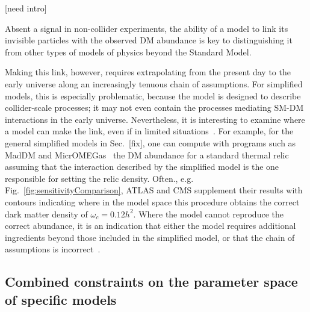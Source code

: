 
[need intro]

Absent a signal in non-collider experiments, the ability of a model to link its invisible particles with the observed DM abundance is key to distinguishing it from other types of models of physics beyond the Standard Model.

Making this link, however, requires extrapolating from the present day to the early universe along an increasingly tenuous chain of assumptions. For simplified models, this is especially problematic, because the model is designed to describe collider-scale processes; it may not even contain the processes mediating SM-DM interactions in the early universe. Nevertheless, it is interesting to examine where a model can make the link, even if in limited situations~\cite{Busoni:2014gta,Catena:2017xqq}. For example, for the general simplified models in Sec.~[fix], one can compute with programs such as MadDM and MicrOMEGas~\cite{Backovic:2015cra,Barducci:2016pcb} the DM abundance for a standard thermal relic assuming that the interaction described by the simplified model is the one responsible for setting the relic density. Often., e.g. Fig.~\ref{fig:sensitivityComparison}, ATLAS and CMS supplement their results with contours indicating where in the model space this procedure obtains the correct dark matter density of $\omega_c = 0.12 h^2$. Where the model cannot reproduce the correct abundance, it is an indication that either the model requires additional ingredients beyond those included in the simplified model, or that the chain of assumptions is incorrect~\cite{Bernal:2017kxu}.



\subsection{Combined constraints on the parameter space of specific models}




